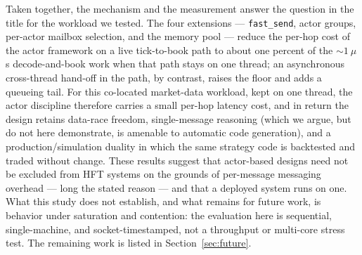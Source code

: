 \documentclass[11pt]{article}
\newcommand{\fs}{\texttt{fast\_send}}
\begin{document}
Taken together, the mechanism and the measurement answer the question in the
title for the workload we tested. The four extensions --- \fs{}, actor groups,
per-actor mailbox selection, and the memory pool --- reduce the per-hop cost of
the actor framework on a live tick-to-book path to about one percent of the
$\sim\!1~\mu$s decode-and-book work when that path stays on one thread; an
asynchronous cross-thread hand-off in the path, by contrast, raises the floor and
adds a queueing tail. For this co-located market-data workload, kept on one
thread, the actor discipline therefore carries a small per-hop latency cost, and in return the design retains data-race freedom,
single-message reasoning (which we argue,
but do not here demonstrate, is amenable to automatic code generation), and a
production/simulation duality in which the same strategy code is backtested and
traded without change. These results suggest that actor-based designs need not be
excluded from HFT systems on the grounds of per-message messaging overhead ---
long the stated reason --- and that a deployed system runs on one. What this study
does not establish, and what remains for future work, is behavior under
saturation and contention: the evaluation here is sequential, single-machine, and
socket-timestamped, not a throughput or multi-core stress test. The remaining
work is listed in Section~\ref{sec:future}.
\end{document}
